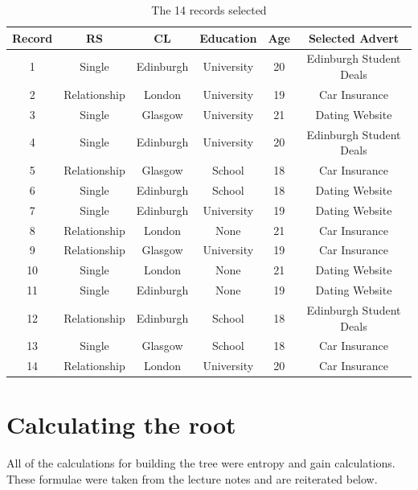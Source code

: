 \documentclass[8pt]{article}
\begin{document}
        
   \begin{center}
    \begin{table}[ht!]
       \centering
        \caption{The 14 records selected}
        \begin{tabular}{|c|c|c|c|c||c|}
          \hline
          \textbf{Record} & \textbf{RS} & \textbf{CL} &\textbf{Education} & \textbf{Age} & \textbf{Selected Advert} \\
           \hline  
           1 & Single        &Edinburgh  &University & 20 & Edinburgh Student Deals \\
           2 & Relationship  &London     &University & 19 & Car Insurance           \\
           3 & Single        &Glasgow    &University & 21 & Dating Website          \\
           4 & Single        &Edinburgh  &University & 20 & Edinburgh Student Deals \\
           5 & Relationship  &Glasgow    &School     & 18 & Car Insurance           \\
           6 & Single        &Edinburgh  &School     & 18 & Dating Website          \\
           7 & Single        &Edinburgh  &University & 19 & Dating Website          \\
           8 & Relationship  &London     &None       & 21 & Car Insurance           \\
           9 & Relationship  &Glasgow    &University & 19 & Car Insurance           \\
           10& Single        &London     &None       & 21 & Dating Website          \\
           11& Single        &Edinburgh  &None       & 19 & Dating Website          \\
           12& Relationship  &Edinburgh  &School     & 18 & Edinburgh Student Deals \\
           13& Single        &Glasgow    &School     & 18 & Car Insurance           \\
           14& Relationship  &London     &University & 20 & Car Insurance           \\
           \hline
         \end{tabular}

    \end{table}
   \end{center}

  \section{Calculating the root}
    All of the calculations for building the tree were entropy and gain calculations. These formulae were
    taken from the lecture notes and are reiterated below.
\end{document}
